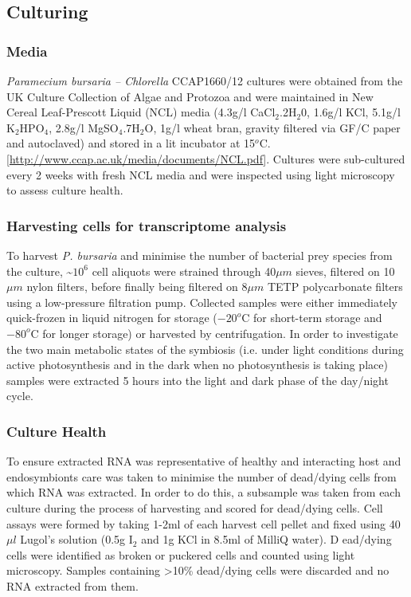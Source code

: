 \documentclass[a4paper,11pt]{article}
\begin{document}
\subsection{Culturing}

\subsubsection{Media}
\textit{Paramecium bursaria – Chlorella} CCAP1660/12 cultures were obtained from the UK Culture Collection of Algae and Protozoa and were maintained in New Cereal Leaf-Prescott Liquid (NCL) media (4.3g/l CaCl$_{2}$.2H$_{2}$0, 1.6g/l KCl, 5.1g/l K$_{2}$HPO$_{4}$, 2.8g/l MgSO$_{4}$.7H$_{2}$O, 1g/l wheat bran, gravity filtered via GF/C paper and autoclaved) and stored in a lit incubator at 15$^{o}$C. [\url{http://www.ccap.ac.uk/media/documents/NCL.pdf}].  
Cultures were sub-cultured every 2 weeks with fresh NCL media and were inspected using light microscopy to assess culture health.  

\subsubsection{Harvesting cells for transcriptome analysis}
To harvest \textit{P. bursaria} and minimise the number of bacterial prey species from the culture, \textasciitilde $10^{6}$ cell aliquots were strained through 40$\mu m$ sieves, filtered on 10$\mu m$ nylon filters, before finally being filtered on 8$\mu m$ TETP polycarbonate filters using a low-pressure filtration pump.  
Collected samples were either immediately quick-frozen in liquid nitrogen for storage ($-20^{o}$C for short-term storage and $-80^{o}$C for longer storage) or harvested by centrifugation.  
In order to investigate the two main metabolic states of the symbiosis (i.e. under light conditions during active photosynthesis and in the dark when no photosynthesis is taking place) samples were extracted 5 hours into the light and dark phase of the day/night cycle.

\subsubsection{Culture Health}
To ensure extracted RNA was representative of healthy and interacting host and endosymbionts care was taken to minimise the number of dead/dying cells from which RNA was extracted.  
In order to do this, a subsample was taken from each culture during the process of harvesting and scored for dead/dying cells.  
Cell assays were formed by taking 1-2ml of each harvest cell pellet and fixed using 40$\mu l$ Lugol's solution (0.5g I$_{2}$ and 1g KCl in 8.5ml of MilliQ water). D
ead/dying cells were identified as broken or puckered cells and counted using light microscopy.  
Samples containing >10\% dead/dying cells were discarded and no RNA extracted from them.
\end{document}
